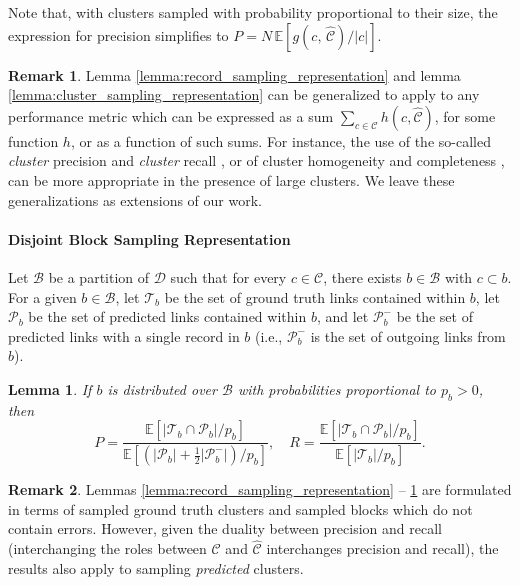 \documentclass[fontsize=11pt]{article}
\newtheorem{lemma}{Lemma}
\theoremstyle{definition}
\newtheorem{remark}{Remark}
\begin{document}
Note that, with clusters sampled with probability proportional to their size, the expression for precision simplifies to
$
    P = N\, \mathbb{E} \left[ g(c,\, \widehat{\mathcal{C}})/\lvert c \rvert \right].
$

\begin{remark}
    Lemma \ref{lemma:record_sampling_representation} and lemma \ref{lemma:cluster_sampling_representation} can be generalized to apply to any performance metric which can be expressed as a sum $\sum_{c \in \mathcal{C}} h(c, \widehat{\mathcal{C}})$, for some function $h$, or as a function of such sums. For instance, the use of the so-called \textit{cluster} precision and \textit{cluster} recall \citep{}, or of cluster homogeneity and completeness \citep{}, can be more appropriate in the presence of large clusters. We leave these generalizations as extensions of our work.
\end{remark}

\paragraph{Disjoint Block Sampling Representation}

Let $\mathcal{B}$ be a partition of $\mathcal{D}$ such that for every $ c \in \mathcal{C}$, there exists $b \in \mathcal{B}$ with $c \subset b$. For a given $b \in \mathcal{B}$, let $\mathcal{T}_b$ be the set of ground truth links contained within $b$, let $\mathcal{P}_b$ be the set of predicted links contained within $b$, and let $\mathcal{P}_b^{-}$ be the set of predicted links with a single record in $b$ (i.e., $\mathcal{P}_b^{-}$ is the set of outgoing links from $b$).

\begin{lemma}\label{lemma:block_sampling_representation}
If $b$ is distributed over $\mathcal{B}$ with probabilities proportional to $p_b > 0$, then
\begin{equation}\label{eq:lemma_3}
    P = \frac{\mathbb{E}\left[ \lvert \mathcal{T}_b \cap \mathcal{P}_b \rvert / p_b \right]}{\mathbb{E}\left[ (\lvert \mathcal{P}_b \rvert + \tfrac{1}{2} \lvert \mathcal{P}_b^{-} \rvert)/p_b \right]}, \quad R = \frac{\mathbb{E}\left[ \lvert \mathcal{T}_b \cap \mathcal{P}_b \rvert / p_b \right]}{\mathbb{E}\left[ \lvert \mathcal{T}_b \rvert / p_b \right]}.
\end{equation}
\end{lemma}

\begin{remark}
    Lemmas \ref{lemma:record_sampling_representation} -- \ref{lemma:block_sampling_representation} are formulated in terms of sampled ground truth clusters and sampled blocks which do not contain errors. However, given the duality between precision and recall (interchanging the roles between $\mathcal{C}$ and $\widehat{\mathcal{C}}$  interchanges precision and recall), the results also apply to sampling \textit{predicted} clusters.
\end{remark}
\end{document}
